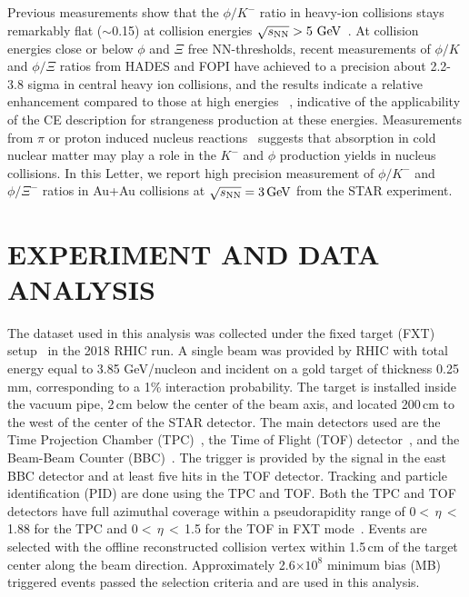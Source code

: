 \documentclass[aps,tightenlines,superscriptaddress,twocolumn]{revtex4-1}
\begin{document}
Previous measurements 
show that the $\phi/K^-$ ratio in heavy-ion collisions stays remarkably flat ($\sim$0.15) at collision energies ${\sqrt{s_{\rm NN}} > \textup{5 GeV}}$~\cite{E917_phi:2004,NA49_phi:2008,star_bes_strangeness:2020}. 
At collision energies close or below $\phi$ and $\Xi$ free NN-thresholds, recent measurements of $\phi/K$ and $\phi/\Xi$ ratios from HADES and FOPI have achieved to a precision about 2.2-3.8 sigma in central heavy ion collisions, and the results indicate a relative enhancement compared to those at high energies
~\cite{HADES_phi_ArKCl:2009,FOPI_phi_NiNi:2015,FOPI_phi_AlAl:2016,HADES_phi_AuAu:2018}, indicative of the applicability of the CE description for strangeness production at these energies. 
Measurements from $\pi$ or proton induced nucleus reactions~\cite{HADES_PRL_pA:2007,HADES_PRL_W_C:2019}
suggests that absorption in cold nuclear matter may play a role in the $K^-$ and $\phi$ production yields in nucleus collisions. 
In this Letter, we report high precision measurement of $\phi/K^-$ and $\phi/\Xi^-$ ratios in Au+Au collisions at ${\sqrt{s_{\rm NN}} = \rm{3\,GeV}}$ from the STAR experiment.

\section{EXPERIMENT AND DATA ANALYSIS }
\label{dataanalysis}

The dataset used in this analysis
was collected under the fixed target (FXT) setup~\cite{Meehan_2016} in the 2018 RHIC run. 
A single beam was provided by RHIC with total energy equal to 3.85 GeV/nucleon and incident on a gold target of thickness 0.25 mm, corresponding to a 1\% interaction probability.
The target is installed inside the vacuum pipe, 2\,cm below the center of the beam axis, and located 200\,cm to the west of the center of the STAR detector. The main detectors used are the Time Projection Chamber (TPC)~\cite{TPC:2003,Meehan_2016}, the Time of Flight (TOF) detector~\cite{TOF:2012,Meehan_2016}, and the Beam-Beam Counter (BBC)~\cite{BBC_Whitten:2008}. The trigger is provided by the signal in the east BBC detector and at least five hits in the TOF detector. Tracking and particle identification (PID) are done using the TPC and TOF. Both the TPC and TOF detectors have full azimuthal coverage within a pseudorapidity range of 0$<$\,$\eta$\,$<$\,1.88 for the TPC and 0$<$\,$\eta$\,$<$\,1.5 for the TOF in FXT mode~\cite{TPC:2003,TOF:2012}. Events are selected with the offline reconstructed collision vertex within 1.5\,cm of the target center along the beam direction. Approximately 2.6$\times 10^{8}$ minimum bias (MB) triggered events passed the selection criteria and are used in this analysis. 
\end{document}
